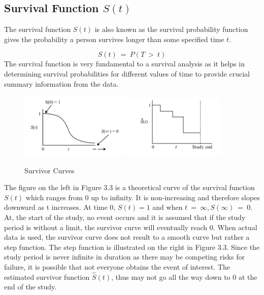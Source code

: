 \documentclass[doublespacing]{report} %
\begin{document}
\subsection{\texorpdfstring{Survival Function \( S(t) \)}{Survival Function S(t)}}
The survival function \(S\left(t\right) \) is also known as the survival probability function gives the probability a person survives longer than some specified time \( t\).

\[S(t)\ =\ P(T\ >\ t)\]
The survival function is very fundamental to a survival analysis as it helps in determining survival probabilities for different values of time  to provide crucial summary information from the data.
\begin{figure}[H]
    \centering
    \includegraphics[width=0.45\textwidth]{Figure 3/3.31.png}
    \hfill
    \includegraphics[width=0.45\textwidth]{Figure 3/3.32.png}
    \caption{Survivor Curves}
    \label{Figure 3.3}
\end{figure}

The figure on the left in Figure 3.3 is a theoretical curve of the survival function\ \(S\left(t\right) \) which ranges from 0 up to infinity. It is non-increasing and therefore slopes downward as t increases. At time 0, \(S\left(t\right)=1\) and when \( t\ =\ \infty , S\left(\infty\right)\ =\ 0.\) At, the start of the study, no event occurs and it is assumed that if the study period is without a limit, the survivor curve will eventually reach 0.
When actual data is used, the survivor curve does not result to a smooth curve but rather a step function. The step function is illustrated on the right in Figure 3.3. Since the study period is never infinite in duration as there may be competing risks for failure, it is possible that not everyone obtains the event of interest. The estimated survivor function \(\hat{S}\left(t\right)\), thus may not go all the way down to 0 at the end of the study.
\end{document}
